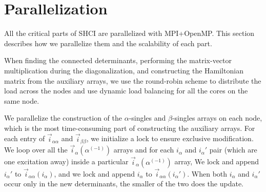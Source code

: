 \documentclass[%
reprint,
 superscriptaddress,
 amsmath,amssymb,
 aps,
]{revtex4-1}
\def\ia{i_\alpha}
\def\vecia{\vec{i}_\alpha}
\def\veciaa{\vec{i}_{\alpha\alpha}}
\def\vecibb{\vec{i}_{\beta\beta}}
\begin{document}
\section{Parallelization}
\label{para}

All the critical parts of SHCI are parallelized with MPI+OpenMP.
This section describes how we parallelize them and the scalability of each part.

When finding the connected determinants, performing the matrix-vector multiplication during the diagonalization,
and constructing the Hamiltonian matrix from the auxiliary arrays, we use the round-robin scheme to distribute the load across the nodes
and use dynamic load balancing for all the cores on the same node.


We parallelize the construction of the $\alpha$-singles and $\beta$-singles arrays on each node, which is the most time-consuming part of constructing the auxiliary arrays.
For each entry of $\veciaa$ and $\vecibb$, we initialize a lock to ensure exclusive modification.
We loop over all the $\vecia({\alpha^{(-1)}})$ arrays and for each $\ia$ and $\ia'$ pair (which are one excitation away) inside a particular $\vecia({\alpha^{(-1)}})$ array,
We lock and append $\ia'$ to $\veciaa{(\ia)}$, and
we lock and append $\ia$ to $\veciaa{(\ia')}$.
When both $\ia$ and $\ia'$ occur only in the new determinants, the smaller of the two does the update.
\end{document}
